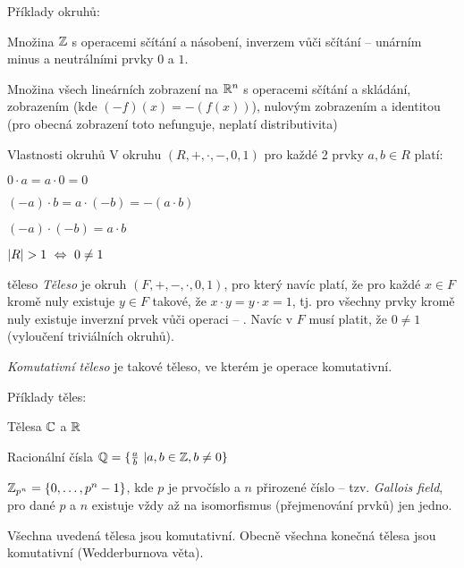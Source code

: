 \begin{priklady}
Příklady okruhů:
\begin{pitemize}
    \item Množina $\mathbb{Z}$ s operacemi sčítání a násobení, inverzem vůči sčítání -- unárním minus a neutrálními prvky $0$ a $1$.
    \item Množina všech lineárních zobrazení na $\mathbb{R}^n$ s operacemi sčítání a skládání,  zobrazením (kde $(-f)(x)=-(f(x))$), nulovým zobrazením a identitou (pro obecná zobrazení toto nefunguje, neplatí distributivita)
\end{pitemize}
\end{priklady}


\begin{poznamkaN}{Vlastnosti okruhů}
V okruhu $(R,+,\cdot,-,0,1)$ pro každé 2 prvky $a,b\in R$ platí: 
\begin{penumerate}
    \item $0\cdot a = a\cdot 0 = 0$
    \item $(-a)\cdot b = a\cdot(-b)=-(a\cdot b)$
    \item $(-a)\cdot(-b)=a\cdot b$
    \item $|R|>1 \ifandonlyif 0 \neq 1$
\end{penumerate}
\end{poznamkaN} 

\begin{definiceN}{těleso}
\emph{Těleso} je okruh $(F,+,-,\cdot,0,1)$, pro který navíc platí, že pro každé $x\in F$ kromě nuly existuje $y\in F$ takové, že $x\cdot y = y\cdot x = 1$, tj. pro všechny prvky kromě nuly existuje inverzní prvek vůči operaci \uv{$\cdot$} -- . Navíc v $F$ musí platit, že $0\neq 1$ (vyloučení triviálních okruhů).  

\emph{Komutativní těleso} je takové těleso, ve kterém je operace \uv{$\cdot$} komutativní.
\end{definiceN}

\begin{priklady}
Příklady těles:
\begin{pitemize}
    \item Tělesa $\mathbb{C}$ a $\mathbb{R}$
    \item Racionální čísla $\mathbb{Q} = \{ \frac{a}{b}\ | a,b\in\mathbb{Z}, b\neq 0\}$
    \item $\mathbb{Z}_{p^{n}}=\{0,\dots,p^n-1\}$, kde $p$ je prvočíslo a $n$ přirozené číslo -- tzv. \emph{Gallois field}, pro dané $p$ a $n$ existuje vždy až na isomorfismus (přejmenování prvků) jen jedno.
\end{pitemize}
Všechna uvedená tělesa jsou komutativní. Obecně všechna konečná tělesa jsou komutativní (Wedderburnova věta).
\end{priklady}



